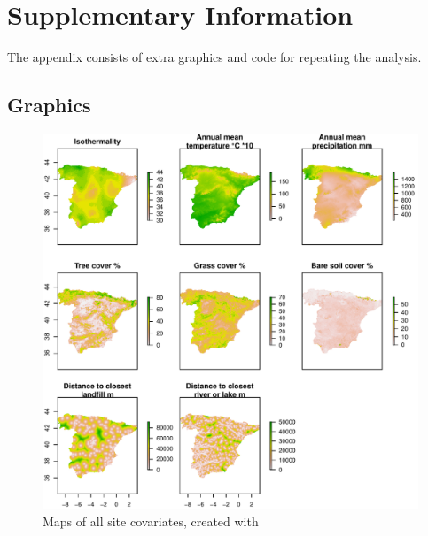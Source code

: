 \documentclass[12pt]{scrartcl} %
\title{\vspace{-2cm}{\Large Actual and future predicted occupancy \\ of the Black Kite in Spain  \\ \small - Case study of the course Monitoring and occupancy modelling - }}
\author{Felix Nößler \\  \small  2$^{nd}$ semester in master program: Ecology, Evolution and Conservation (M.Sc.), \\ \small Registration number: 810578}
\date{{\large \today}}
\begin{document}


\maketitle
\onehalfspacing



\newpage
\printbibliography

\newpage
\section*{Supplementary Information}

The appendix consists of extra graphics and code for repeating the analysis. 

\subsection*{Graphics}
\begin{figure}[H]
	\centering
	\includegraphics[width=\linewidth]{img/site_covs}
	\caption{Maps of all site covariates, created with \textcite{raster}}
	\label{fig:site_cov_maps}
\end{figure}
\end{document}
